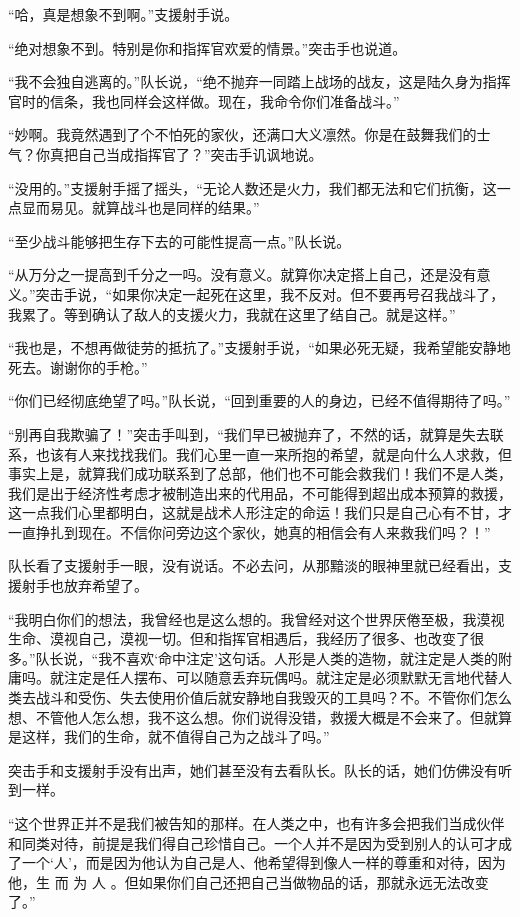 “哈，真是想象不到啊。”支援射手说。

“绝对想象不到。特别是你和指挥官欢爱的情景。”突击手也说道。

“我不会独自逃离的。”队长说，“绝不抛弃一同踏上战场的战友，这是陆久身为指挥官时的信条，我也同样会这样做。现在，我命令你们准备战斗。”

“妙啊。我竟然遇到了个不怕死的家伙，还满口大义凛然。你是在鼓舞我们的士气？你真把自己当成指挥官了？”突击手讥讽地说。

“没用的。”支援射手摇了摇头，“无论人数还是火力，我们都无法和它们抗衡，这一点显而易见。就算战斗也是同样的结果。”

“至少战斗能够把生存下去的可能性提高一点。”队长说。

“从万分之一提高到千分之一吗。没有意义。就算你决定搭上自己，还是没有意义。”突击手说，“如果你决定一起死在这里，我不反对。但不要再号召我战斗了，我累了。等到确认了敌人的支援火力，我就在这里了结自己。就是这样。”

“我也是，不想再做徒劳的抵抗了。”支援射手说，“如果必死无疑，我希望能安静地死去。谢谢你的手枪。”

“你们已经彻底绝望了吗。”队长说，“回到重要的人的身边，已经不值得期待了吗。”

“别再自我欺骗了！”突击手叫到，“我们早已被抛弃了，不然的话，就算是失去联系，也该有人来找找我们。我们心里一直一来所抱的希望，就是向什么人求救，但事实上是，就算我们成功联系到了总部，他们也不可能会救我们！我们不是人类，我们是出于经济性考虑才被制造出来的代用品，不可能得到超出成本预算的救援，这一点我们心里都明白，这就是战术人形注定的命运！我们只是自己心有不甘，才一直挣扎到现在。不信你问旁边这个家伙，她真的相信会有人来救我们吗？！”

队长看了支援射手一眼，没有说话。不必去问，从那黯淡的眼神里就已经看出，支援射手也放弃希望了。

“我明白你们的想法，我曾经也是这么想的。我曾经对这个世界厌倦至极，我漠视生命、漠视自己，漠视一切。但和指挥官相遇后，我经历了很多、也改变了很多。”队长说，“我不喜欢‘命中注定’这句话。人形是人类的造物，就注定是人类的附庸吗。就注定是任人摆布、可以随意丢弃玩偶吗。就注定是必须默默无言地代替人类去战斗和受伤、失去使用价值后就安静地自我毁灭的工具吗？不。不管你们怎么想、不管他人怎么想，我不这么想。你们说得没错，救援大概是不会来了。但就算是这样，我们的生命，就不值得自己为之战斗了吗。”

突击手和支援射手没有出声，她们甚至没有去看队长。队长的话，她们仿佛没有听到一样。

“这个世界正并不是我们被告知的那样。在人类之中，也有许多会把我们当成伙伴和同类对待，前提是我们得自己珍惜自己。一个人并不是因为受到别人的认可才成了一个‘人’，而是因为他认为自己是人、他希望得到像人一样的尊重和对待，因为他，生 而 为 人 。但如果你们自己还把自己当做物品的话，那就永远无法改变了。”

